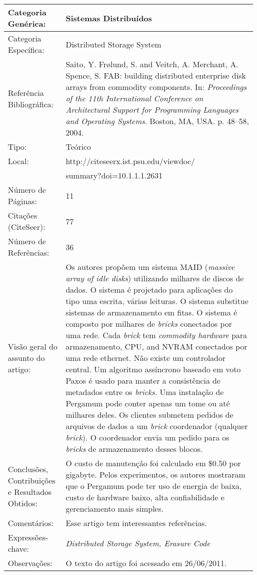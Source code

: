 \documentclass[10pt,a4paper]{article}
\begin{document}
\begin{center}
\begin{tabular}{|p{5cm}||p{10cm}|}
\end{tabular}
\end{center}

\begin{center}
\begin{tabular}{|p{5cm}||p{10cm}|}
\hline

Categoria Genérica: & Sistemas Distribuídos\\\hline
Categoria Específica: & Distributed Storage System\\\hline
Referência Bibliográfica: & Saito, Y. Fr{\o}lund, S. and Veitch, A. Merchant, A. Spence, S. FAB: building distributed enterprise disk arrays from commodity components. In:  \emph{Proceedings of the 11th International Conference on Architectural Support for Programming Languages and Operating Systems}. Boston, MA, USA. p. 48--58, 2004.\\\hline
Tipo: & Teórico\\\hline
Local: & http://citeseerx.ist.psu.edu/viewdoc/\\ &summary?doi=10.1.1.1.2631\\\hline
Número de Páginas: & 11\\\hline
Citações (CiteSeer): & 77\\\hline
Número de Referências: & 36\\\hline
Visão geral do assunto do artigo: & Os autores propõem um sistema MAID (\emph{massive array of idle disks}) utilizando milhares de discos de dados. O sistema é projetado para aplicações do tipo uma escrita, várias leituras. O sistema substitue sistemas de armazenamento em fitas. O sistema é composto por milhares  de \emph{bricks} conectados por uma rede. Cada \emph{brick} tem \emph{commodity hardware} para armazenamento, CPU, and NVRAM conectados por uma rede ethernet. Não existe um controlador central. Um algoritmo assíncrono baseado em voto  Paxos é usado para manter a consistência de metadados entre os \emph{bricks}. Uma instalação de Pergamum pode conter apenas um tome ou até milhares deles. Os clientes submetem pedidos de arquivos de dados a um \emph{brick} coordenador (qualquer \emph{brick}). O coordenador envia um pedido para os \emph{bricks} de armazenamento desses blocos. \\\hline
Conclusões, Contribuições e Resultados Obtidos: & O custo de manutenção foi calculado em \$0.50 por gigabyte. Pelos experimentos, os autores mostraram que o Pergamum pode ter uso de energia de baixa, custo de hardware baixo, alta confiabilidade e gerenciamento mais simples. \\\hline
Comentários: & Esse artigo tem interessantes referências.\\\hline
Expressões-chave: & \emph{Distributed Storage System, Erasure Code}\\\hline
Observações: & O texto do artigo foi acessado em 26/06/2011.\\\hline

\end{tabular}
\end{center}
\end{document}
